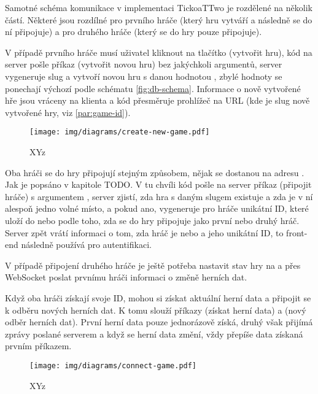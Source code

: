 Samotné schéma komunikace v implementaci TickoaTTwo je rozdělené na několik
částí. Některé jsou rozdílné pro prvního hráče (který hru vytváří a následně se
do ní připojuje) a pro druhého hráče (který se do hry pouze připojuje).

V případě prvního hráče musí uživatel kliknout na tlačítko 
(vytvořit hru), kód na server pošle příkaz  (vytvořit novou
hru) bez jakýchkoli argumentů, server vygeneruje slug a vytvoří novou hru s
danou hodnotou , zbylé hodnoty se ponechají výchozí podle schématu
\ref{fig:db-schema}. Informace o nově vytvořené hře jsou vráceny na klienta a
kód přesměruje prohlížeč na URL  (kde 
je slug nově vytvořené hry, viz \ref{par:game-id}).

\begin{figure}[h]
    \centering
    \texttt{[image: img/diagrams/create-new-game.pdf]}
    \caption{XYz}
    \label{fig:create-new-game}
\end{figure}

Oba hráči se do hry připojují stejným způsobem, nějak se dostanou na adresu
. Jak je popsáno v kapitole TODO. V tu chvíli kód pošle na server
příkaz  (připojit hráče) s argumentem , server zjistí,
zda hra s daným slugem existuje a zda je v ní alespoň jedno volné místo, a
pokud ano, vygeneruje pro hráče unikátní ID, které uloží do  nebo
 podle toho, zda se do hry připojuje jako první nebo druhý hráč.
Server zpět vrátí informaci o tom, zda hráč je  nebo  a
jeho unikátní ID, to front-end následně používá pro autentifikaci.

V případě připojení druhého hráče je ještě potřeba nastavit stav hry na
 a přes WebSocket poslat prvnímu hráči informaci o změně
herních dat.

Když oba hráči získají svoje ID, mohou si získat aktuální herní data a připojit
se k odběru nových herních dat. K tomu slouží příkazy  (získat
herní data) a  (nový odběr herních dat). První herní
data pouze jednorázově získá, druhý však přijímá zprávy poslané serverem a když
se herní data změní, vždy přepíše data získaná prvním příkazem.

\begin{figure}[h]
    \centering
    \texttt{[image: img/diagrams/connect-game.pdf]}
    \caption{XYz}
    \label{fig:connect-game}
\end{figure}
